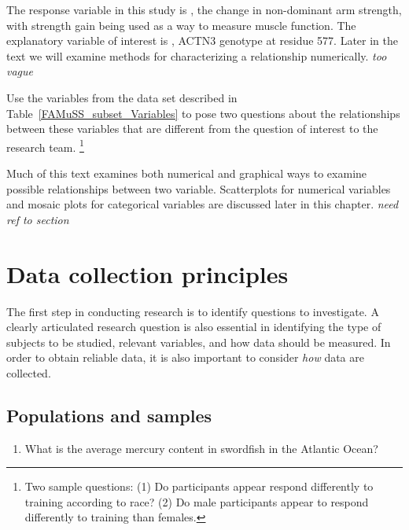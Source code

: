 \begin{doublespace}
The response variable in this study is , the change in non-dominant arm strength, with strength gain being used as a way to measure muscle function. The explanatory variable of interest is , ACTN3 genotype at residue 577.  Later in the text we will examine methods for characterizing a relationship numerically.  \textit{too vague}

\begin{exercise}
Use the variables from the  data set described in Table~\ref{FAMuSS_subset_Variables} to pose two questions about the relationships between these variables that are different from the question of interest to the research team. \footnote{Two sample questions: (1)  Do participants appear respond differently to training according to race?  (2)  Do male participants appear to respond differently to training than females.}

\end{exercise}

Much of this text examines both numerical and graphical ways to examine possible relationships between two variable.  Scatterplots for numerical variables and mosaic plots for categorical variables are discussed later in this chapter.  \textit{need ref to section}


\section{Data collection principles}
\label{DataCollectionPrinciples}


The first step in conducting research is to identify questions to investigate. A clearly articulated research question is also essential in identifying the type of subjects to be studied, relevant variables, and how data should be measured. In order to obtain reliable data, it is also important to consider \textit{how} data are collected.


\subsection{Populations and samples}
\label{populationsAndSamples}

\begin{enumerate}
\setlength{\itemsep}{0mm}

\item What is the average mercury content in swordfish in the Atlantic Ocean?


\end{enumerate}
\end{doublespace}
